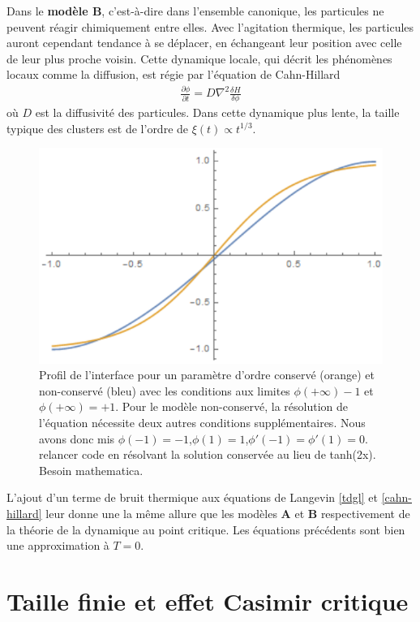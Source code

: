 Dans le \textbf{modèle B}, c'est-à-dire dans l'ensemble canonique, les particules ne peuvent réagir chimiquement entre elles. Avec l'agitation thermique, les particules auront cependant tendance à se déplacer, en échangeant leur position avec celle de leur plus proche voisin. Cette dynamique locale, qui décrit les phénomènes locaux comme la diffusion, est régie par l'équation de Cahn-Hillard\cite{cahn_free_nodate,langer_new_1975,kawasaki_growth_1978}
\begin{align}
    \frac{\partial \phi}{\partial t} = D \nabla^2 \frac{\delta H}{\delta \phi} 
    \label{cahn-hillard}
\end{align}
où $D$ est la diffusivité des particules. Dans cette dynamique plus lente, la taille typique des clusters est de l'ordre de $\xi(t) \propto t^{1/3}$.

\begin{figure}
    \centering
    \includegraphics[width=0.5\linewidth]{intro/profil-KawVsGlau.png}
    \caption{Profil de l'interface pour un paramètre d'ordre conservé (orange) et non-conservé (bleu) avec les conditions aux limites $\phi(+\infty)-1$ et $\phi(+\infty)=+1$. Pour le modèle non-conservé, la résolution de l'équation \label{langevin-kawasaki} nécessite deux autres conditions supplémentaires. Nous avons donc mis $\phi(-1)=-1$,$\phi(1)=1$,$\phi'(-1)=\phi'(1)=0$. {\color{red} relancer code en résolvant la solution conservée au lieu de tanh(2x). Besoin mathematica.}}
\end{figure}

L'ajout d'un terme de bruit thermique aux équations de Langevin \ref{tdgl} et \ref{cahn-hillard} leur donne une la même allure que les modèles \textbf{A} et \textbf{B} respectivement de la théorie de la dynamique au point critique\cite{hohenberg_theory_1977}. Les équations précédents sont bien une approximation à $T=0$.


    \section{Taille finie et effet Casimir critique}
    
